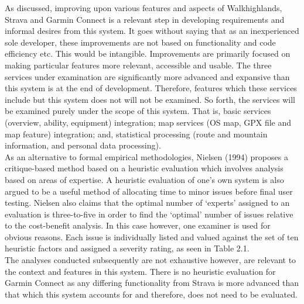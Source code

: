 \documentclass[11pt, english]{article}
\begin{document}
	As discussed, improving upon various features and aspects of Walkhighlands, Strava and Garmin Connect is a relevant step in developing requirements and informal desires from this system. It goes without saying that as an inexperienced sole developer, these improvements are not based on functionality and code efficiency etc. This would be intangible. Improvements are primarily focused on making particular features more relevant, accessible and usable. The three services under examination are significantly more advanced and expansive than this system is at the end of development. Therefore, features which these services include but this system does not will not be examined. So forth, the services will be examined purely under the scope of this system. That is, basic services (overview, ability, equipment) integration; map services (OS map, GPX file and map feature) integration; and, statistical processing (route and mountain information, and personal data processing).\\

	As an alternative to formal empirical methodologies, Nielsen (1994) proposes a critique-based method based on a heuristic evaluation which involves analysis based on areas of expertise. A heuristic evaluation of one's own system is also argued to be a useful method of allocating time to minor issues before final user testing. Nielsen also claims that the optimal number of `experts' assigned to an evaluation is three-to-five in order to find the `optimal' number of issues relative to the cost-benefit analysis. In this case however, one examiner is used for obvious reasons. Each issue is individually listed and valued against the set of ten heuristic factors and assigned a severity rating, as seen in Table 2.1.\\

	The analyses conducted subsequently are not exhaustive however, are relevant to the context and features in this system. There is no heuristic evaluation for Garmin Connect as any differing functionality from Strava is more advanced than that which this system accounts for and therefore, does not need to be evaluated.
\end{document}
